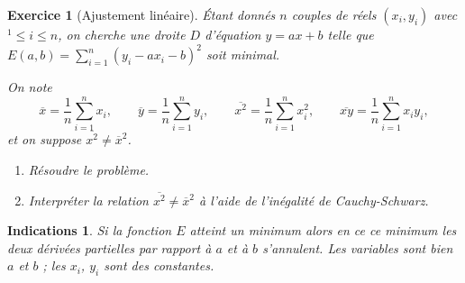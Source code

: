 \documentclass[11pt,a4paper]{article}
\renewcommand{\le}{\leqslant} \renewcommand{\leq}{\leqslant}
\theoremstyle{exostyle}
\newtheorem{exo}{Exercice}
\newtheorem{ind}{Indications}
\newcommand{\exercice}[1]{} \newcommand{\finexercice}{}
\newcommand{\enonce}{\begin{exo}} \newcommand{\finenonce}{\end{exo}}
\newcommand{\indication}{\begin{ind}} \newcommand{\finindication}{\end{ind}}
\begin{document}
\exercice{4159, quercia, 2010/03/11}
\enonce[Ajustement linéaire]

Étant donnés $n$ couples de réels  
$(x_i,y_i)$ avec $^1 \le i \le n$,
on cherche une droite $D$ d'équation $y = ax+b$ telle que
$E(a,b) = \sum_{i=1}^n (y_i-ax_i-b)^2$ soit minimal.

On note
$$\overline  x    = \frac 1n \sum_{i=1}^n x_i,\qquad
\overline  y    = \frac 1n \sum_{i=1}^n y_i,\qquad
\overline {x^2} = \frac 1n \sum_{i=1}^n x_i^2,\qquad
\overline {xy} = \frac 1n \sum_{i=1}^n x_iy_i,$$
et on suppose $\overline {x^2} \ne \overline x^2$.

\begin{enumerate}
	\item Résoudre le problème.
	\item Interpréter la relation $\overline {x^2} \ne \overline x^2$
	à l'aide de l'inégalité de Cauchy-Schwarz.
\end{enumerate}
\finenonce

\indication
Si la fonction $E$ atteint un minimum alors en ce ce minimum les deux dérivées partielles par rapport à $a$ et à $b$ s'annulent. Les variables sont bien $a$ et $b$ ; les $x_i$, $y_i$ sont des constantes.
\finindication
\end{document}
